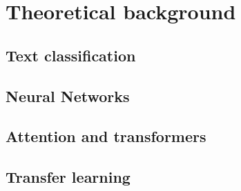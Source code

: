 \chapter{Theoretical background}
\section{Text classification}
\section{Neural Networks }
\section{Attention and transformers}
\section{Transfer learning}

